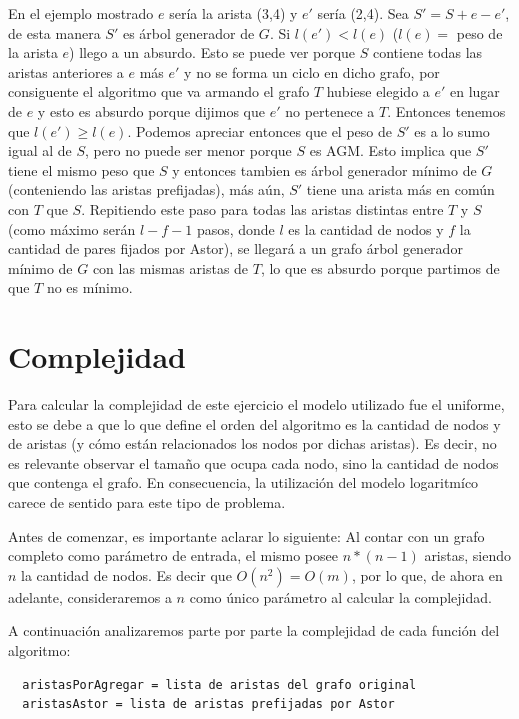 \documentclass[a4paper,11pt] {article}
\begin{document}
\begin{itemize}
En el ejemplo mostrado $e$ ser\'ia la arista (3,4) y $e'$ ser\'ia (2,4). Sea $S'=S+e-e'$, de esta manera $S'$ es \'arbol generador de $G$. Si $l(e')<l(e)$ ($l(e)=$ peso de la arista $e$) llego a un absurdo. Esto se puede ver porque $S$ contiene todas las aristas anteriores a $e$ m\'as $e'$ y no se forma un ciclo en dicho grafo, por consiguente el algoritmo que va armando el grafo $T$ hubiese elegido a $e'$ en lugar de $e$ y esto es absurdo porque dijimos que $e'$ no pertenece a $T$. Entonces tenemos que $l(e')\geq l(e)$. Podemos apreciar entonces que el peso de $S'$ es a lo sumo igual al de $S$, pero no puede ser menor porque $S$ es AGM. Esto implica que $S'$ tiene el mismo peso que $S$ y entonces tambien es \'arbol generador m\'inimo de $G$ (conteniendo las aristas prefijadas), m\'as a\'un, $S'$ tiene una arista m\'as en com\'un con $T$ que $S$. Repitiendo este paso para todas las aristas distintas entre $T$ y $S$ (como m\'aximo ser\'an $l-f-1$ pasos, donde $l$ es la cantidad de nodos y $f$ la cantidad de pares fijados por Astor), se llegar\'a a un grafo \'arbol generador m\'inimo de $G$ con las mismas aristas de $T$, lo que es absurdo porque partimos de que $T$ no es m\'inimo.

\end{itemize}

\section*{Complejidad}

Para calcular la complejidad de este ejercicio el modelo utilizado fue el uniforme, esto se debe a que lo que define el orden del algoritmo es la cantidad de nodos y de aristas (y cómo están relacionados los nodos  por dichas aristas). Es decir, no es relevante observar el tamaño que ocupa cada nodo, sino la cantidad de nodos que contenga el grafo. En consecuencia, la utilizaci\'on del modelo logaritm\'ico carece de sentido para este tipo de problema.

Antes de comenzar, es importante aclarar lo siguiente: Al contar con un grafo completo como parámetro de entrada, el mismo posee $n*(n-1)$ aristas, siendo $n$ la cantidad de nodos. Es decir que $O(n^2) = O(m)$, por lo que, de ahora en adelante, consideraremos a $n$ como único parámetro al calcular la complejidad.

A continuación analizaremos parte por parte la complejidad de cada función del algoritmo:

\begin{verbatim}
  aristasPorAgregar = lista de aristas del grafo original
  aristasAstor = lista de aristas prefijadas por Astor
\end{verbatim}
\end{document}
